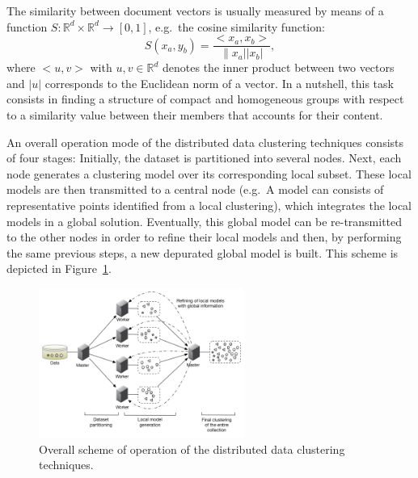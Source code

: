 \documentclass[10pt]{article}
\begin{document}
The similarity between document vectors is usually measured by means of a function $S:\mathbb{R}^d\times \mathbb{R}^d\rightarrow[0,1]$, e.g.\  the cosine similarity function: \[S(x_a,y_b)=\frac{<x_a,x_b>}{\|x_a||x_b|},\] where $<u,v>$ with $u,v\in\mathbb{R}^d$ denotes the inner product between two vectors and $|u|$ corresponds to the Euclidean norm of a vector.
In a nutshell, this task consists in finding a structure of compact and homogeneous groups with respect to a similarity value between their members that accounts for their content. 

An overall operation mode of the distributed data clustering techniques consists of four stages: Initially, the dataset is partitioned into several nodes. Next, each node generates a clustering model over its corresponding local subset. These local models are then transmitted to a central node (e.g.\ A model can consists of representative points identified from a local clustering), which integrates the local models in a global solution. Eventually, this global model can be re-transmitted to the 
other nodes in order to refine their local models and then, by performing the same previous steps, a new depurated 
global model is built. This scheme is depicted in Figure~\ref{fig:distributed_clustering}.

\begin{figure}[!h]
\centering
\includegraphics[width=0.6\textwidth]{./figs/distributed_data_clustering_scheme_en.png}
\caption{Overall scheme of operation of the distributed data clustering techniques.}
\label{fig:distributed_clustering}
\end{figure}
\end{document}
